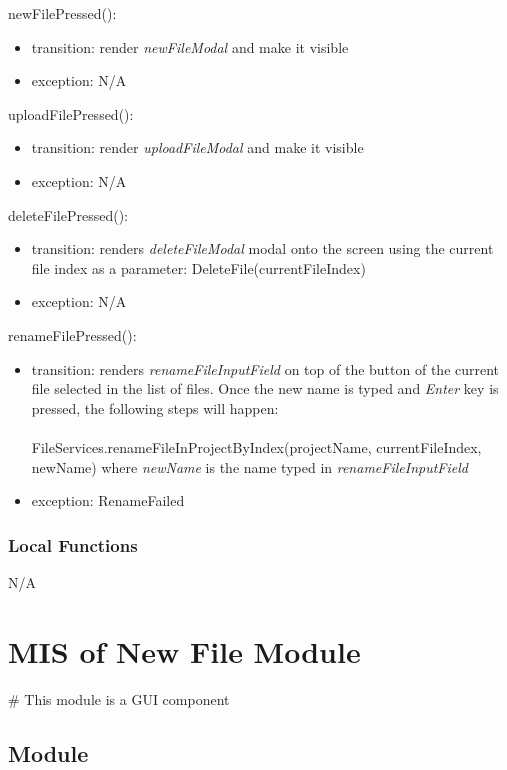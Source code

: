 \documentclass[12pt, titlepage]{article}
\begin{document}
	\noindent newFilePressed():
	\begin{itemize}
		\item transition: render \textit{newFileModal} and make it visible
		\item exception: N/A
	\end{itemize}
	
	\noindent uploadFilePressed():
	\begin{itemize}
		\item transition: render \textit{uploadFileModal} and make it visible
		\item exception: N/A
	\end{itemize}
	
	\noindent deleteFilePressed():
	\begin{itemize}
		\item transition: renders \textit{deleteFileModal} modal onto the screen using the current file index as a parameter: DeleteFile(currentFileIndex)
		\item exception: N/A
	\end{itemize}
	
	\noindent renameFilePressed():
	\begin{itemize}
		\item transition: renders \textit{renameFileInputField} on top of the button of the current file selected in the list of files. Once the new name is typed and \textit{Enter} key is pressed, the following steps will happen: \\\\
		FileServices.renameFileInProjectByIndex(projectName, currentFileIndex, newName) where \textit{newName} is the name typed in \textit{renameFileInputField}
		\item exception: RenameFailed
	\end{itemize}
	
	\subsubsection{Local Functions}
	N/A
	
	\newpage
	
	\section{MIS of New File Module} \label{Module} 
	\# This module is a GUI component
	\subsection{Module}
	
\end{document}
